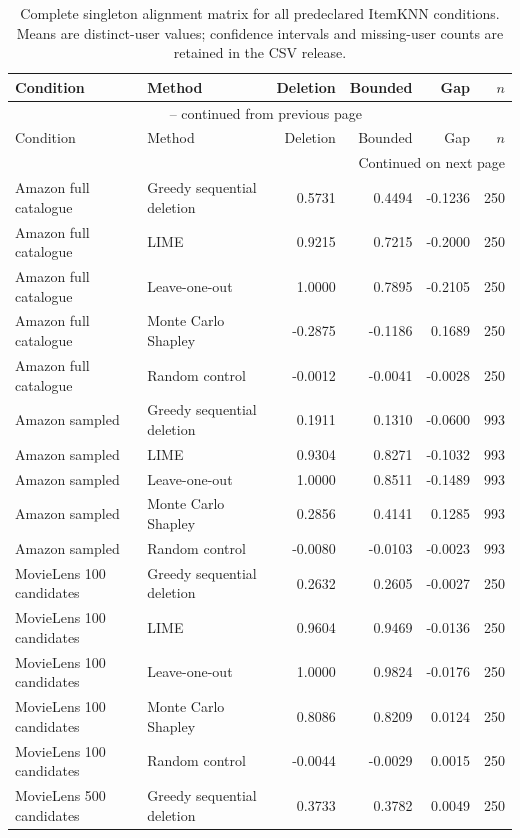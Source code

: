 \begin{longtable}{@{}p{}p{}rrrr@{}}
\caption{Complete singleton alignment matrix for all predeclared ItemKNN conditions. Means are distinct-user values; confidence intervals and missing-user counts are retained in the CSV release.}\label{tab:S1}\\
\toprule
Condition & Method & Deletion & Bounded & Gap & $n$ \\
\midrule
\endfirsthead
\multicolumn{6}{c}{\tablename\ \thetable{} -- continued from previous page}\\
\toprule
Condition & Method & Deletion & Bounded & Gap & $n$ \\
\midrule
\endhead
\midrule
\multicolumn{6}{r}{Continued on next page}\\
\endfoot
\bottomrule
\endlastfoot
Amazon full catalogue & Greedy sequential deletion & 0.5731 & 0.4494 & -0.1236 & 250 \\
Amazon full catalogue & LIME & 0.9215 & 0.7215 & -0.2000 & 250 \\
Amazon full catalogue & Leave-one-out & 1.0000 & 0.7895 & -0.2105 & 250 \\
Amazon full catalogue & Monte Carlo Shapley & -0.2875 & -0.1186 & 0.1689 & 250 \\
Amazon full catalogue & Random control & -0.0012 & -0.0041 & -0.0028 & 250 \\
Amazon sampled & Greedy sequential deletion & 0.1911 & 0.1310 & -0.0600 & 993 \\
Amazon sampled & LIME & 0.9304 & 0.8271 & -0.1032 & 993 \\
Amazon sampled & Leave-one-out & 1.0000 & 0.8511 & -0.1489 & 993 \\
Amazon sampled & Monte Carlo Shapley & 0.2856 & 0.4141 & 0.1285 & 993 \\
Amazon sampled & Random control & -0.0080 & -0.0103 & -0.0023 & 993 \\
MovieLens 100 candidates & Greedy sequential deletion & 0.2632 & 0.2605 & -0.0027 & 250 \\
MovieLens 100 candidates & LIME & 0.9604 & 0.9469 & -0.0136 & 250 \\
MovieLens 100 candidates & Leave-one-out & 1.0000 & 0.9824 & -0.0176 & 250 \\
MovieLens 100 candidates & Monte Carlo Shapley & 0.8086 & 0.8209 & 0.0124 & 250 \\
MovieLens 100 candidates & Random control & -0.0044 & -0.0029 & 0.0015 & 250 \\
MovieLens 500 candidates & Greedy sequential deletion & 0.3733 & 0.3782 & 0.0049 & 250 \\

\end{longtable}

